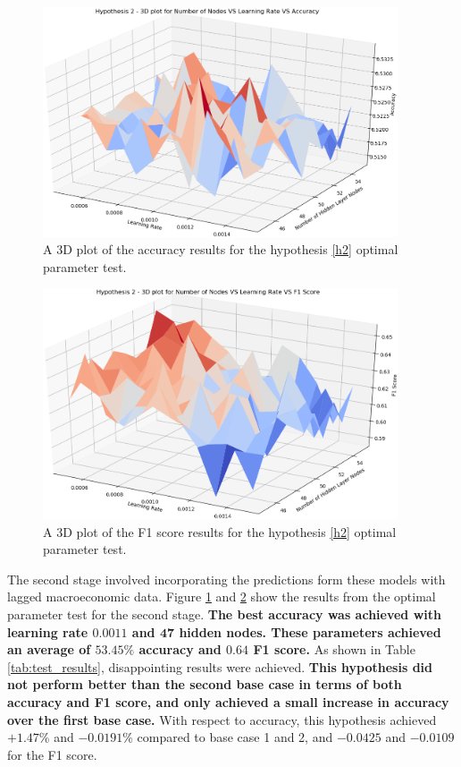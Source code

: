 \documentclass{UoYCSproject}
\begin{document}
\begin{figure}[h]
\includegraphics[width=10.5cm]{h2_accuracy.png}
\centering
\caption{A 3D plot of the accuracy results for the hypothesis \ref{h2} optimal parameter test.} 
\label{fig:h2_plot_accuracy}
\end{figure}

\begin{figure}[h]
\includegraphics[width=10.5cm]{h2_f1.png}
\centering
\caption{A 3D plot of the F1 score results for the hypothesis \ref{h2} optimal parameter test.} 
\label{fig:h2_plot_f1}
\end{figure}

The second stage involved incorporating the predictions form these models with lagged macroeconomic data. Figure \ref{fig:h2_plot_accuracy} and \ref{fig:h2_plot_f1} show the results from the optimal parameter test for the second stage. \textbf{The best accuracy was achieved with learning rate $\boldsymbol{0.0011}$ and $\boldsymbol{47}$ hidden nodes. These parameters achieved an average of $\boldsymbol{53.45\%}$ accuracy and $\boldsymbol{0.64}$ F1 score.} As shown in Table \ref{tab:test_results}, disappointing results were achieved. \textbf{This hypothesis did not perform better than the second base case in terms of both accuracy and F1 score, and only achieved a small increase in accuracy over the first base case.} With respect to accuracy, this hypothesis achieved $+1.47$\% and $-0.0191$\% compared to base case 1 and 2, and  $-0.0425$ and $-0.0109$ for the F1 score.   
\end{document}
